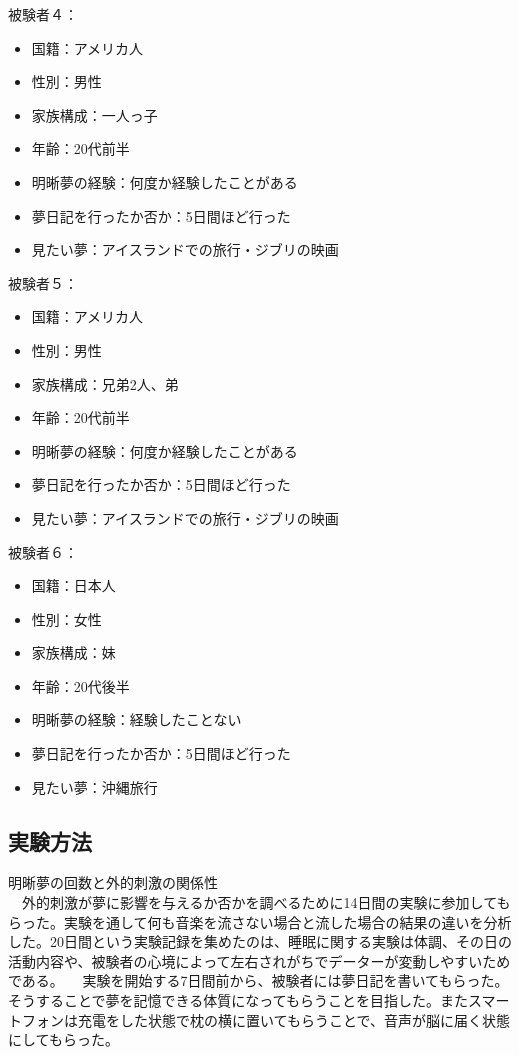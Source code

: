 被験者４：
\begin{itemize}
\item 国籍：アメリカ人
\item 性別：男性
\item 家族構成：一人っ子
\item 年齢：20代前半
\item 明晰夢の経験：何度か経験したことがある
\item 夢日記を行ったか否か：5日間ほど行った
\item 見たい夢：アイスランドでの旅行・ジブリの映画
\end{itemize}

被験者５：
\begin{itemize}
\item 国籍：アメリカ人
\item 性別：男性
\item 家族構成：兄弟2人、弟
\item 年齢：20代前半
\item 明晰夢の経験：何度か経験したことがある
\item 夢日記を行ったか否か：5日間ほど行った
\item 見たい夢：アイスランドでの旅行・ジブリの映画
\end{itemize}

被験者６：
\begin{itemize}
\item 国籍：日本人
\item 性別：女性
\item 家族構成：妹
\item 年齢：20代後半
\item 明晰夢の経験：経験したことない
\item 夢日記を行ったか否か：5日間ほど行った
\item 見たい夢：沖縄旅行
\end{itemize}

\subsection{実験方法}
明晰夢の回数と外的刺激の関係性\\
　外的刺激が夢に影響を与えるか否かを調べるために14日間の実験に参加してもらった。実験を通して何も音楽を流さない場合と流した場合の結果の違いを分析した。20日間という実験記録を集めたのは、睡眠に関する実験は体調、その日の活動内容や、被験者の心境によって左右されがちでデーターが変動しやすいためである。
　実験を開始する7日間前から、被験者には夢日記を書いてもらった。そうすることで夢を記憶できる体質になってもらうことを目指した。またスマートフォンは充電をした状態で枕の横に置いてもらうことで、音声が脳に届く状態にしてもらった。

